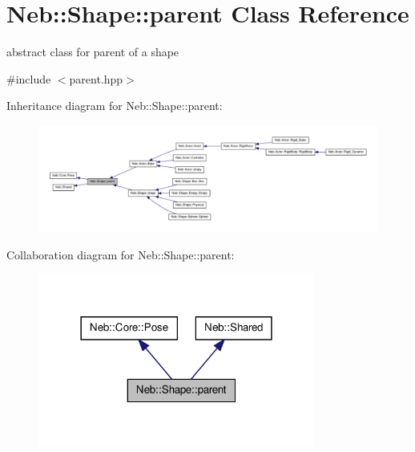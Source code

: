\hypertarget{classNeb_1_1Shape_1_1parent}{\section{\-Neb\-:\-:\-Shape\-:\-:parent \-Class \-Reference}
\label{classNeb_1_1Shape_1_1parent}
}


abstract class for parent of a shape  




{\ttfamily \#include $<$parent.\-hpp$>$}



\-Inheritance diagram for \-Neb\-:\-:\-Shape\-:\-:parent\-:
\nopagebreak
\begin{figure}[H]
\begin{center}
\leavevmode
\includegraphics[width=350pt]{classNeb_1_1Shape_1_1parent__inherit__graph}
\end{center}
\end{figure}


\-Collaboration diagram for \-Neb\-:\-:\-Shape\-:\-:parent\-:
\nopagebreak
\begin{figure}[H]
\begin{center}
\leavevmode
\includegraphics[width=258pt]{classNeb_1_1Shape_1_1parent__coll__graph}
\end{center}
\end{figure}
